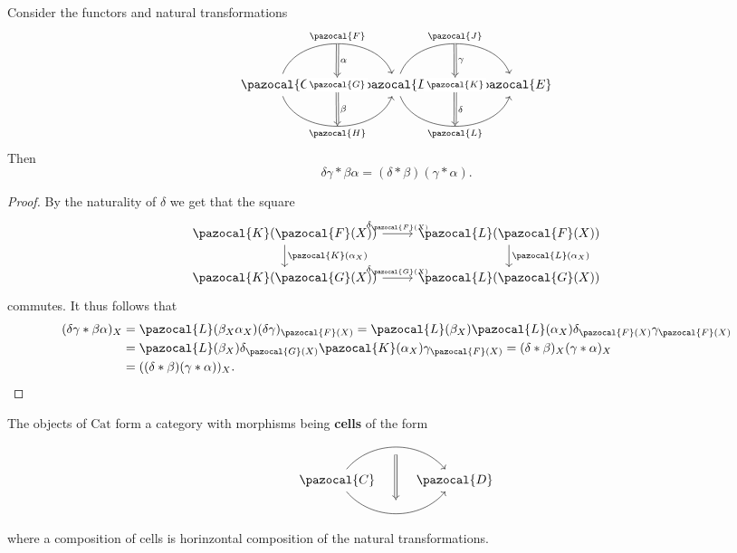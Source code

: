 \begin{lemma}
    Consider the functors and natural transformations
    $$
        \begin{tikzcd}
            \pazocal{C} \arrow[r, bend left=70, "\pazocal{F}"{name=F}] \arrow[r, "\pazocal{G}"{name=G, description}]
            \arrow[r, bend right=70, "\pazocal{H}"{name=H,swap}] & \pazocal{D} \arrow[Rightarrow, from=F, to=G, "\alpha"]\arrow[Rightarrow,from=G, to=H, "\beta"] \arrow[r, bend left=70, "\pazocal{J}"{name=J}] \arrow[r, "\pazocal{K}"{name=K, description}]
            \arrow[r, bend right=70, "\pazocal{L}"{name=L,swap}] & \pazocal{E} \arrow[Rightarrow, from=J, to=K,"\gamma"]\arrow[Rightarrow, from=K, to=L, "\delta"]
        \end{tikzcd}
    $$
    Then 
    $$
        \delta\gamma \ast \beta\alpha = (\delta\ast \beta)(\gamma\ast \alpha).
    $$
\end{lemma}
\begin{proof}
    By the naturality of $\delta$ we get that the square 
    $$
        \begin{tikzcd}
            \pazocal{K}(\pazocal{F}(X)) \arrow[r, "\delta_{\pazocal{F}(X)}"] \arrow[d,"\pazocal{K}(\alpha_X)"] & \pazocal{L}(\pazocal{F}(X)) \arrow[d, "\pazocal{L}(\alpha_X)"]\\
            \pazocal{K}(\pazocal{G}(X)) \arrow[r,"\delta_{\pazocal{G}(X)}"] & \pazocal{L}(\pazocal{G}(X))
        \end{tikzcd}
    $$
    commutes. It thus follows that 
    \begin{align*}
        (\delta\gamma \ast \beta\alpha)_X &= \pazocal{L}(\beta_X\alpha_X)(\delta\gamma)_{\pazocal{F}(X)} = \pazocal{L}(\beta_X)\pazocal{L}(\alpha_X)\delta_{\pazocal{F}(X)}\gamma_{\pazocal{F}(X)}\\
        &= \pazocal{L}(\beta_X)\delta_{\pazocal{G}(X)} \pazocal{K}(\alpha_X)\gamma_{\pazocal{F}(X)}= (\delta \ast \beta)_X (\gamma\ast\alpha)_X\\
        &=((\delta\ast\beta)(\gamma\ast \alpha))_X.
    \end{align*}
\end{proof}
\begin{proposition}
    The objects of $\mathrm{Cat}$ form a category with morphisms being \textbf{cells} of the form 
    $$
        \begin{tikzcd}
            \pazocal{C} \arrow[r, bend right=50,""{name=1}]\arrow[r,bend left=50,""{name=2}] & \pazocal{D} \arrow[Rightarrow, from=2, to=1, shorten <= 6, shorten >= 6] 
        \end{tikzcd}
    $$ 
    where a composition of cells is horinzontal composition of the natural transformations. 
\end{proposition}
